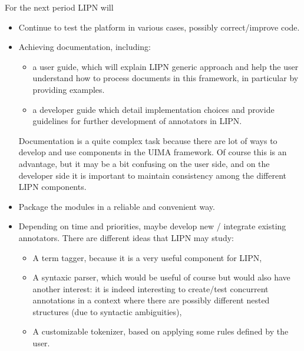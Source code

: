 For the next period LIPN will
\begin{itemize}
\item Continue to test the platform in various cases, possibly correct/improve code.
\item Achieving documentation, including:
\begin{itemize}
\item a user guide, which will explain LIPN generic approach and help the user understand how to process documents in this framework, in particular by providing examples.
\item a developer guide which detail implementation choices and provide guidelines for further development of annotators in LIPN.
\end{itemize}
Documentation is a quite complex task because there are lot of ways to develop and use components in the UIMA framework. Of course this is an advantage, but it may be a bit confusing on the user side, and on the developer side it is important to maintain consistency among the different LIPN components.
\item Package the modules in a reliable and convenient way.
\item {} Depending on time and priorities, maybe develop new / integrate existing annotators. There are different ideas that LIPN may study:
\begin{itemize}
\item A term tagger, because it is a very useful component for LIPN,
\item A syntaxic parser, which would be useful of course but would also have another interest: it is indeed interesting to create/test concurrent annotations in a context where there are possibly different nested structures (due to syntactic ambiguities),
\item A customizable tokenizer, based on applying some rules defined by the user.
\end{itemize}
\end{itemize}

